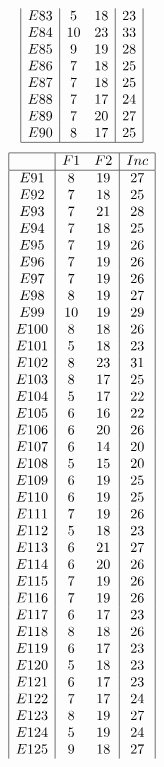 \documentclass[12pt]{article}
\begin{document}
\begin{multicols}{3}
\begin{equation*}
\begin{array}{|c|cc|c|}
E83&5&18&23\\
E84&10&23&33\\
E85&9&19&28\\
E86&7&18&25\\
E87&7&18&25\\
E88&7&17&24\\
E89&7&20&27\\
E90&8&17&25\\
\hline
\end{array}
\end{equation*}
\begin{equation*}
\begin{array}{|c|cc|c|}
\hline
&F1&F2&Inc\\
\hline
E91&8&19&27\\
E92&7&18&25\\
E93&7&21&28\\
E94&7&18&25\\
E95&7&19&26\\
E96&7&19&26\\
E97&7&19&26\\
E98&8&19&27\\
E99&10&19&29\\
E100&8&18&26\\
E101&5&18&23\\
E102&8&23&31\\
E103&8&17&25\\
E104&5&17&22\\
E105&6&16&22\\
E106&6&20&26\\
E107&6&14&20\\
E108&5&15&20\\
E109&6&19&25\\
E110&6&19&25\\
E111&7&19&26\\
E112&5&18&23\\
E113&6&21&27\\
E114&6&20&26\\
E115&7&19&26\\
E116&7&19&26\\
E117&6&17&23\\
E118&8&18&26\\
E119&6&17&23\\
E120&5&18&23\\
E121&6&17&23\\
E122&7&17&24\\
E123&8&19&27\\
E124&5&19&24\\
E125&9&18&27\\

\end{array}
\end{equation*}
\end{multicols}
\end{document}
